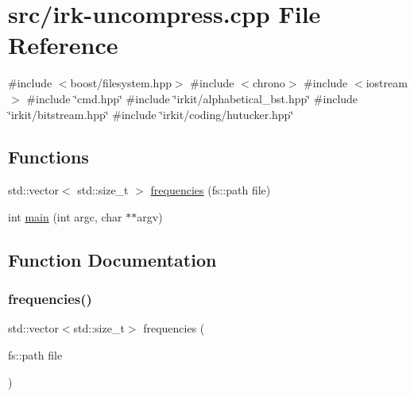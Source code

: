\hypertarget{irk-uncompress_8cpp}{}\section{src/irk-\/uncompress.cpp File Reference}
\label{irk-uncompress_8cpp}
{\ttfamily \#include $<$boost/filesystem.\+hpp$>$}\newline
{\ttfamily \#include $<$chrono$>$}\newline
{\ttfamily \#include $<$iostream$>$}\newline
{\ttfamily \#include \char`\"{}cmd.\+hpp\char`\"{}}\newline
{\ttfamily \#include \char`\"{}irkit/alphabetical\+\_\+bst.\+hpp\char`\"{}}\newline
{\ttfamily \#include \char`\"{}irkit/bitstream.\+hpp\char`\"{}}\newline
{\ttfamily \#include \char`\"{}irkit/coding/hutucker.\+hpp\char`\"{}}\newline
\subsection*{Functions}
\begin{DoxyCompactItemize}
\item 
std\+::vector$<$ std\+::size\+\_\+t $>$ \mbox{\hyperlink{irk-uncompress_8cpp_a2cd80733ced3d7eda8a6de0389cccc73}{frequencies}} (fs\+::path file)
\item 
int \mbox{\hyperlink{irk-uncompress_8cpp_a3c04138a5bfe5d72780bb7e82a18e627}{main}} (int argc, char $\ast$$\ast$argv)
\end{DoxyCompactItemize}


\subsection{Function Documentation}
\mbox{\label{irk-uncompress_8cpp_a2cd80733ced3d7eda8a6de0389cccc73}} 
\subsubsection{\texorpdfstring{frequencies()}{frequencies()}}
{\footnotesize\ttfamily std\+::vector$<$std\+::size\+\_\+t$>$ frequencies (\begin{DoxyParamCaption}\item[{fs\+::path}]{file }\end{DoxyParamCaption})}

